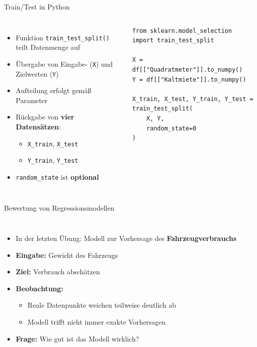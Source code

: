 \begin{frame}[fragile]{Train/Test in Python}
\footnotesize
\begin{columns}
\begin{itemize}
    \item Funktion \texttt{train\_test\_split()} teilt Datenmenge auf
    \item Übergabe von Eingabe- (\texttt{X}) und Zielwerten (\texttt{Y})
    \item Aufteilung erfolgt gemäß Parameter
    \item Rückgabe von \textbf{vier Datensätzen}:
    \begin{itemize}
        \item \texttt{X\_train}, \texttt{X\_test}
        \item \texttt{Y\_train}, \texttt{Y\_test}
    \end{itemize}
    
    \item \texttt{random\_state} ist \textbf{optional}
    
\end{itemize}

\begin{verbatim}
from sklearn.model_selection import train_test_split

X = df[["Quadratmeter"]].to_numpy()
Y = df[["Kaltmiete"]].to_numpy()

X_train, X_test, Y_train, Y_test = train_test_split(
    X, Y,
    random_state=0
)
\end{verbatim}
\end{columns}
\end{frame}


\begin{frame}{Bewertung von Regressionsmodellen}
\begin{columns}


\begin{itemize}
    \item In der letzten Übung: Modell zur Vorhersage des \textbf{Fahrzeugverbrauchs}
    \item \textbf{Eingabe: } Gewicht des Fahrzeugs
    \item \textbf{Ziel: } Verbrauch abschätzen
    \item \textbf{Beobachtung: }
    \begin{itemize}
        \item Reale Datenpunkte weichen teilweise deutlich ab
        \item Modell trifft nicht immer exakte Vorhersagen
    \end{itemize}
    \item \textbf{Frage: }Wie gut ist das Modell wirklich?
\end{itemize}
\end{columns}
\end{frame}


